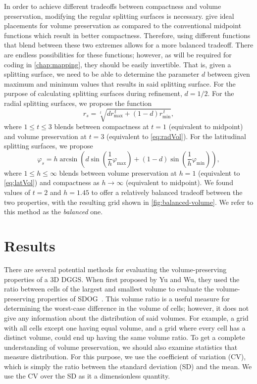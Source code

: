 In order to achieve different tradeoffs between compactness and volume preservation, modifying the regular splitting surfaces is necessary.
 give ideal placements for volume preservation as compared to the conventional midpoint functions which result in better compactness.
Therefore, using different functions that blend between these two extremes allows for a more balanced tradeoff.
There are endless possibilities for these functions; however, as will be required for coding in \cref{chap:mapping}, they should be easily invertible.
That is, given a splitting surface, we need to be able to determine the parameter $d$ between given maximum and minimum values that results in said splitting surface.
For the purpose of calculating splitting surfaces during refinement, $d = 1/2$.
For the radial splitting surfaces, we propose the function
%
\begin{equation} \label{eq:radBlend}
r_{s} = \sqrt[t]{ d r_\mathrm{max}^{\,t} + \left( 1 - d \right) r_\mathrm{min}^{\,t} },
\end{equation}
%
where $1 \leq t \leq 3$ blends between compactness at $t = 1$ (equivalent to midpoint) and volume preservation at $t=3$ (equivalent to \cref{eq:radVol}).
For the latitudinal splitting surfaces, we propose
%
\begin{equation} \label{eq:latBlend}
\varphi_{s} = h \arcsin \left( d \sin \left( \frac{1}{h} \varphi_\mathrm{max} \right) + \left( 1 - d \right) \sin \left( \frac{1}{h} \varphi_\mathrm{min} \right) \right),
\end{equation}
%
where $1 \leq h \leq \infty$ blends between volume preservation at $h = 1$ (equivalent to \cref{eq:latVol}) and compactness as $h \rightarrow \infty$ (equivalent to midpoint).
We found values of $t = 2$ and $h = 1.45$ to offer a relatively balanced tradeoff between the two properties, with the resulting grid shown in \cref{fig:balanced-volume}.
We refer to this method as the \textit{balanced} one.


\section{Results} \label{chap:4:results}
There are several potential methods for evaluating the volume-preserving properties of a 3D DGGS.
When first proposed by Yu and Wu, they used the ratio between cells of the largest and smallest volume to evaluate the volume-preserving properties of SDOG~\cite{yu2009sdog}.
This volume ratio is a useful measure for determining the worst-case difference in the volume of cells; however, it does not give any information about the distribution of said volumes.
For example, a grid with all cells except one having equal volume, and a grid where every cell has a distinct volume, could end up having the same volume ratio.
To get a complete understanding of volume preservation, we should also examine statistics that measure distribution.
For this purpose, we use the coefficient of variation (CV), which is simply the ratio between the standard deviation (SD) and the mean.
We use the CV over the SD as it a dimensionless quantity.


